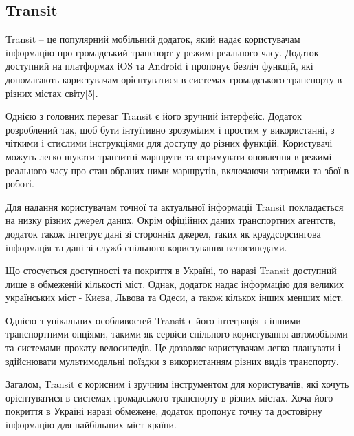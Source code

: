 \subsection{Transit}
\label{subsec:transit-subsection}

Transit -- це популярний мобільний додаток, який надає користувачам інформацію про громадський транспорт у режимі реального часу. Додаток доступний на платформах iOS та Android і пропонує безліч функцій, які допомагають користувачам орієнтуватися в системах громадського транспорту в різних містах світу[5].

Однією з головних переваг Transit є його зручний інтерфейс. Додаток розроблений так, щоб бути інтуїтивно зрозумілим і простим у використанні, з чіткими і стислими інструкціями для доступу до різних функцій. Користувачі можуть легко шукати транзитні маршрути та отримувати оновлення в режимі реального часу про стан обраних ними маршрутів, включаючи затримки та збої в роботі.

Для надання користувачам точної та актуальної інформації Transit покладається на низку різних джерел даних. Окрім офіційних даних транспортних агентств, додаток також інтегрує дані зі сторонніх джерел, таких як краудсорсингова інформація та дані зі служб спільного користування велосипедами.

Що стосується доступності та покриття в Україні, то наразі Transit доступний лише в обмеженій кількості міст. Однак, додаток надає інформацію для великих українських міст - Києва, Львова та Одеси, а також кількох інших менших міст.

Однією з унікальних особливостей Transit є його інтеграція з іншими транспортними опціями, такими як сервіси спільного користування автомобілями та системами прокату велосипедів. Це дозволяє користувачам легко планувати і здійснювати мультимодальні поїздки з використанням різних видів транспорту.

Загалом, Transit є корисним і зручним інструментом для користувачів, які хочуть орієнтуватися в системах громадського транспорту в різних містах. Хоча його покриття в Україні наразі обмежене, додаток пропонує точну та достовірну інформацію для найбільших міст країни.

